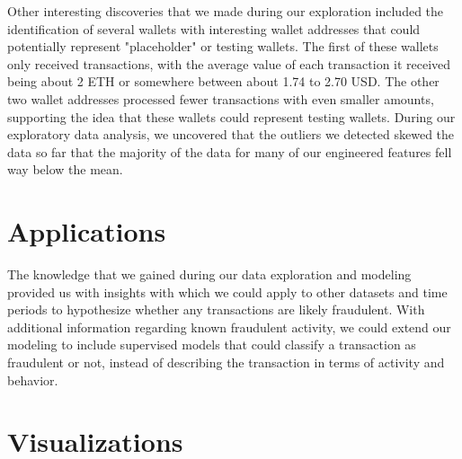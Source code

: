 \documentclass[sigconf]{acmart}
\begin{document}
Other interesting discoveries that we made during our exploration included the identification of several wallets with interesting wallet addresses that could potentially represent "placeholder" or testing wallets. The first of these wallets only received transactions, with the average value of each transaction it received being about 2 ETH or somewhere between about 1.74 to 2.70 USD. The other two wallet addresses processed fewer transactions with even smaller amounts, supporting the idea that these wallets could represent testing wallets. During our exploratory data analysis, we uncovered that the outliers we detected skewed the data so far that the majority of the data for many of our engineered features fell way below the mean. 


\section{Applications}
The knowledge that we gained during our data exploration and modeling provided us with insights with which we could apply to other datasets and time periods to hypothesize whether any transactions are likely fraudulent. With additional information regarding known fraudulent activity, we could extend our modeling to include supervised models that could classify a transaction as fraudulent or not, instead of describing the transaction in terms of activity and behavior. 


\section{Visualizations}




 
\end{document}
